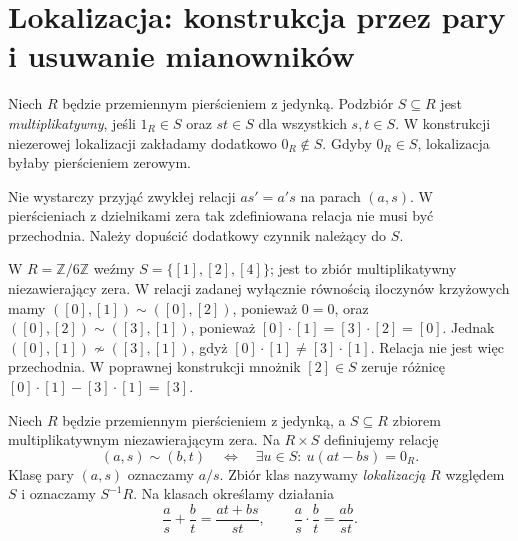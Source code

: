 \section{Lokalizacja: konstrukcja przez pary i usuwanie mianowników}
\begin{definicja}
\label{aa:def:multiplicative-set}
Niech $R$ będzie przemiennym pierścieniem z jedynką.
Podzbiór $S\subseteq R$ jest \emph{multiplikatywny},
jeśli $1_R\in S$ oraz $st\in S$ dla wszystkich $s,t\in S$.
W konstrukcji niezerowej lokalizacji zakładamy dodatkowo
$0_R\notin S$. Gdyby $0_R\in S$, lokalizacja byłaby
pierścieniem zerowym.
\end{definicja}

Nie wystarczy przyjąć zwykłej relacji $as'=a's$
na parach $(a,s)$. W pierścieniach z dzielnikami zera
tak zdefiniowana relacja nie musi być przechodnia.
Należy dopuścić dodatkowy czynnik należący do $S$.

\begin{przyklad}
\label{aa:prz:naive-local-relation}
W $R=\mathbb Z/6\mathbb Z$ weźmy
$S=\{[1],[2],[4]\}$; jest to zbiór multiplikatywny
niezawierający zera. W relacji zadanej wyłącznie
równością iloczynów krzyżowych mamy
$( [0],[1])\sim([0],[2])$, ponieważ $0=0$,
oraz $([0],[2])\sim([3],[1])$, ponieważ
$[0]\cdot[1]=[3]\cdot[2]=[0]$.
Jednak $([0],[1])\not\sim([3],[1])$, gdyż
$[0]\cdot[1]\ne[3]\cdot[1]$.
Relacja nie jest więc przechodnia. W poprawnej
konstrukcji mnożnik $[2]\in S$ zeruje różnicę
$[0]\cdot[1]-[3]\cdot[1]=[3]$.
\end{przyklad}

\begin{definicja}
\label{aa:def:localization}
Niech $R$ będzie przemiennym pierścieniem z jedynką,
a $S\subseteq R$ zbiorem multiplikatywnym niezawierającym zera.
Na $R\times S$ definiujemy relację
\[
 (a,s)\sim(b,t)
 \quad\Longleftrightarrow\quad
 \exists u\in S:\ u(at-bs)=0_R.
\]
Klasę pary $(a,s)$ oznaczamy $a/s$. Zbiór klas
nazywamy \emph{lokalizacją} $R$ względem $S$ i oznaczamy
$S^{-1}R$. Na klasach określamy działania
\[
 \frac as+\frac bt=\frac{at+bs}{st},\qquad
 \frac as\cdot\frac bt=\frac{ab}{st}.
\]
\end{definicja}


